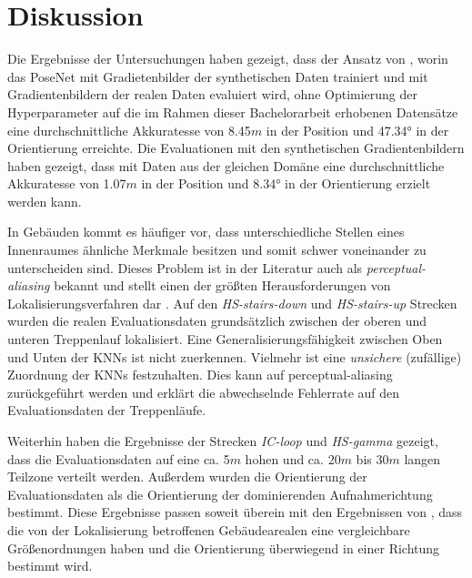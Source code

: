 
\section{Diskussion}
\label{sec:kapitel_5}


Die Ergebnisse der Untersuchungen haben gezeigt, dass der Ansatz von \citet{acharyaBIMPoseNetIndoorCamera2019}, worin das PoseNet mit Gradietenbilder der synthetischen Daten trainiert und mit Gradientenbildern der realen Daten evaluiert wird, ohne Optimierung der Hyperparameter auf die im Rahmen dieser Bachelorarbeit erhobenen Datensätze eine durchschnittliche Akkuratesse von 8.45$m$ in der Position und 47.34° in der Orientierung erreichte. Die Evaluationen mit den synthetischen Gradientenbildern haben gezeigt, dass mit Daten aus der gleichen Domäne eine durchschnittliche Akkuratesse von 1.07$m$ in der Position und 8.34° in der Orientierung erzielt werden kann. 


In Gebäuden kommt es häufiger vor, dass unterschiedliche Stellen eines Innenraumes ähnliche Merkmale besitzen und somit schwer voneinander zu unterscheiden sind. Dieses Problem ist in der Literatur auch als \textit{perceptual-aliasing} bekannt und stellt einen der größten Herausforderungen von Lokalisierungsverfahren dar \cite{lowryVisualPlaceRecognition2016}. Auf den \textit{HS-stairs-down} und \textit{HS-stairs-up} Strecken wurden die realen Evaluationsdaten grundsätzlich zwischen der oberen und unteren Treppenlauf lokalisiert. Eine Generalisierungsfähigkeit zwischen Oben und Unten der KNNs ist nicht zuerkennen. Vielmehr ist eine \textit{unsichere} (zufällige) Zuordnung der KNNs festzuhalten. Dies kann auf perceptual-aliasing zurückgeführt werden und erklärt die abwechselnde Fehlerrate auf den Evaluationsdaten der Treppenläufe.

Weiterhin haben die Ergebnisse der Strecken \textit{IC-loop} und \textit{HS-gamma} gezeigt, dass die Evaluationsdaten auf eine ca. 5$m$ hohen und ca. 20$m$ bis 30$m$ langen Teilzone verteilt werden. Außerdem wurden die Orientierung der Evaluationsdaten als die Orientierung der dominierenden Aufnahmerichtung bestimmt. Diese Ergebnisse passen soweit überein mit den Ergebnissen von \citet{acharyaBIMPoseNetIndoorCamera2019}, dass die von der Lokalisierung betroffenen Gebäudearealen eine vergleichbare Größenordnungen haben und die Orientierung überwiegend in einer Richtung bestimmt wird.

